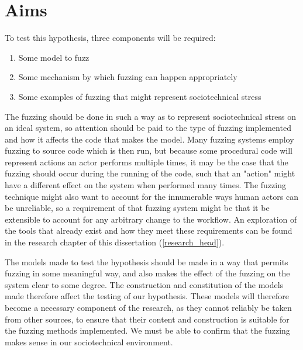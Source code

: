\section{Aims}
\label{aims}
To test this hypothesis, three components will be required:
\begin{enumerate}
    \item Some model to fuzz
    \item Some mechanism by which fuzzing can happen appropriately
    \item Some examples of fuzzing that might represent sociotechnical stress
\end{enumerate}\par%

The fuzzing should be done in such a way as to represent sociotechnical stress on an ideal system, so attention should be paid to the type of fuzzing implemented and how it affects the code that makes the model. Many fuzzing systems employ fuzzing to source code which is then run, but because some procedural code will represent actions an actor performs multiple times, it may be the case that the fuzzing should occur during the running of the code, such that an "action" might have a different effect on the system when performed many times. The fuzzing technique might also want to account for the innumerable ways human actors can be unreliable, so a requirement of that fuzzing system might be that it be extensible to account for any arbitrary change to the workflow. An exploration of the tools that already exist and how they meet these requirements can be found in the research chapter of this dissertation (\cref{research_head}). \par%

The models made to test the hypothesis should be made in a way that permits fuzzing in some meaningful way, and also makes the effect of the fuzzing on the system clear to some degree. The construction and constitution of the models made therefore affect the testing of our hypothesis. These models will therefore become a necessary component of the research, as they cannot reliably be taken from other sources, to ensure that their content and construction is suitable for the fuzzing methods implemented. We must be able to confirm that the fuzzing makes sense in our sociotechnical environment. \par%

